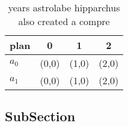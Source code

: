 \documentclass[a4paper]{article}
\begin{document}
\begin{table}
\begin{adjustbox}{width=0.6\columnwidth}
\begin{tabular}{|l|l|l|l|}
\hline
\textbf{plan} & \multicolumn{1}{c|}{\textbf{0}} & \multicolumn{1}{c|}{\textbf{1}} & \multicolumn{1}{c|}{\textbf{2}} \\ \hline
\textbf{$a_0$}  & (0,0) & (1,0) & (2,0) \\ \hline
\textbf{$a_1$}  & (0,0) & (1,0) & (2,0) \\ \hline
\end{tabular}
\end{adjustbox}
\caption{ years astrolabe hipparchus also created a compre
}
\end{table}

\subsection{SubSection}
\end{document}
